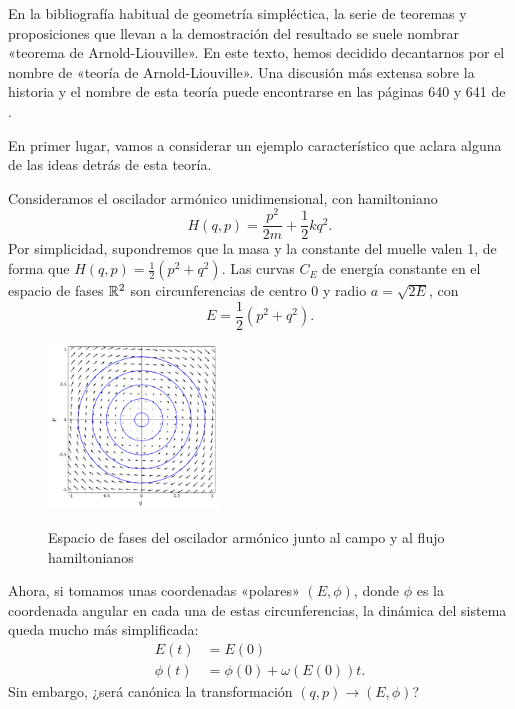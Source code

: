 En la bibliografía habitual de geometría simpléctica, la serie de teoremas y proposiciones que llevan a la demostración del resultado se suele nombrar «teorema de Arnold-Liouville». En este texto, hemos decidido decantarnos por el nombre de «teoría de Arnold-Liouville». Una discusión más extensa sobre la historia y el nombre de esta teoría puede encontrarse en las páginas 640 y 641 de \cite{spivak}.

En primer lugar, vamos a considerar un ejemplo característico que aclara alguna de las ideas detrás de esta teoría.
\begin{ejemplo}
  Consideramos el oscilador armónico unidimensional, con hamiltoniano
  \begin{equation*}
    H(q,p)=\frac{p^2}{2m}+\frac{1}{2}kq^2.
  \end{equation*}
  Por simplicidad, supondremos que la masa y la constante del muelle valen 1, de forma que $H(q,p)=\frac{1}{2}(p^2+q^2)$. Las curvas $C_E$ de energía constante en el espacio de fases $\mathbb{R}^2$ son circunferencias de centro 0 y radio $a=\sqrt{2E}$, con
  \begin{equation*}
    E=\frac{1}{2}(p^2+q^2).
  \end{equation*}
  \begin{figure}[h]
    \centering
    \includegraphics[width=0.4\textwidth]{pics/oscilador}
    \label{fig:oscilador}
    \caption{Espacio de fases del oscilador armónico junto al campo y al flujo hamiltonianos}
  \end{figure}
  Ahora, si tomamos unas coordenadas «polares» $(E,\phi)$, donde $\phi$ es la coordenada angular en cada una de estas circunferencias, la dinámica del sistema queda mucho más simplificada: 
  \begin{align*}
    E(t)&=E(0) \\
    \phi(t)&=\phi(0)+\omega(E(0))t.
  \end{align*}
  Sin embargo, ¿será canónica la transformación $(q,p) \rightarrow (E,\phi)$?
  \begin{figure}[h]

\end{figure}
\end{ejemplo}
